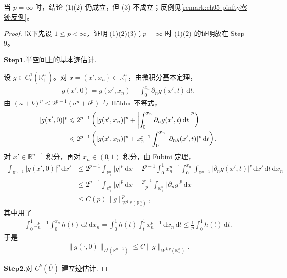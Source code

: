 \documentclass[../../main.tex]{subfiles}%
\begin{document}
当 $p=\infty$ 时，结论 (1)(2) 仍成立，但 (3) 不成立；反例见\cref{remark:ch05-pinfty零迹反例}。

\begin{proof}
以下先设 $1\leqslant p<\infty$，证明 (1)(2)(3)；$p=\infty$ 时 (1)(2) 的证明放在 Step 9。

\noindent$\mathbf{Step}\mathbf{1}.${\heiti 半空间上的基本迹估计.}

设 $g\in C^{1}_{c}(\overline{\mathbb{R}^{n}_{+}})$。对 $x=(x',x_{n})\in\mathbb{R}^{n}_{+}$，由微积分基本定理，
\begin{align*}
g(x',0)=g(x',x_{n})-\int_{0}^{x_{n}}\partial_{n}g(x',t)\,\mathrm{d}t.
\end{align*}
由 $(a+b)^{p}\leqslant 2^{p-1}(a^{p}+b^{p})$ 与 Hölder 不等式，
\begin{align}
|g(x',0)|^{p}
&\leqslant 2^{p-1}\left(|g(x',x_{n})|^{p}
+\left|\int_{0}^{x_{n}}\partial_{n}g(x',t)\,\mathrm{d}t\right|^{p}\right)
\notag\\
&\leqslant 2^{p-1}\left(|g(x',x_{n})|^{p}
+x_{n}^{p-1}\int_{0}^{x_{n}}|\partial_{n}g(x',t)|^{p}\,\mathrm{d}t\right).
\label{eq:ch05-证明-半空间逐点}
\end{align}
对 $x'\in\mathbb{R}^{n-1}$ 积分，再对 $x_{n}\in(0,1)$ 积分，由 Fubini 定理，
\begin{align*}
\int_{\mathbb{R}^{n-1}}|g(x',0)|^{p}\,\mathrm{d}x'
&\leqslant
2^{p-1}\int_{\mathbb{R}^{n}_{+}}|g|^{p}\,\mathrm{d}x
+2^{p-1}\int_{0}^{1}x_{n}^{p-1}
\int_{0}^{x_{n}}\int_{\mathbb{R}^{n-1}}
|\partial_{n}g(x',t)|^{p}\,\mathrm{d}x'\,\mathrm{d}t\,\mathrm{d}x_{n}\\
&\leqslant
2^{p-1}\int_{\mathbb{R}^{n}_{+}}|g|^{p}\,\mathrm{d}x
+\frac{2^{p-1}}{p}\int_{\mathbb{R}^{n}_{+}}|\partial_{n}g|^{p}\,\mathrm{d}x\\
&\leqslant C(p)\|g\|_{W^{1,p}(\mathbb{R}^{n}_{+})}^{p},
\end{align*}
其中用了
\begin{align*}
\int_{0}^{1}x_{n}^{p-1}\int_{0}^{x_{n}}h(t)\,\mathrm{d}t\,\mathrm{d}x_{n}
=\int_{0}^{1}h(t)\int_{t}^{1}x_{n}^{p-1}\,\mathrm{d}x_{n}\,\mathrm{d}t
\leqslant\frac{1}{p}\int_{0}^{1}h(t)\,\mathrm{d}t.
\end{align*}
于是
\begin{align}
\|g(\cdot,0)\|_{L^{p}(\mathbb{R}^{n-1})}
\leqslant C\|g\|_{W^{1,p}(\mathbb{R}^{n}_{+})}.
\label{eq:ch05-证明-半空间估计}
\end{align}

\noindent$\mathbf{Step}\mathbf{2}.${\heiti 对 $C^{k}(\overline{U})$ 建立迹估计.}


\end{proof}
\end{document}
